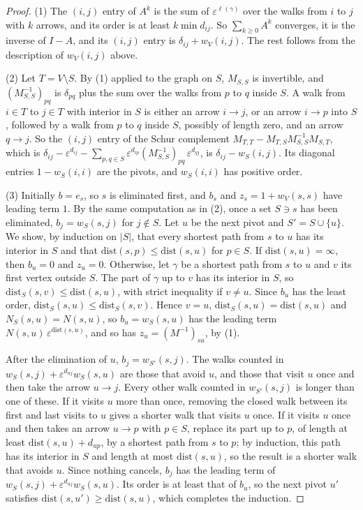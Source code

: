 \documentclass[12pt, a4paper]{report}
\theoremstyle{plain}
\theoremstyle{definition}
\theoremstyle{remark}
\theoremstyle{plain}
\begin{document}
\begin{proof}
(1) The $(i,j)$ entry of $A^k$ is the sum of $\varepsilon^{\ell(\gamma)}$ over the walks from $i$ to $j$ with $k$ arrows, and its order is at least $k\min d_{ij}$. So $\sum_{k\geq0}A^k$ converges, it is the inverse of $I-A$, and its $(i,j)$ entry is $\delta_{ij}+w_V(i,j)$. The rest follows from the description of $w_V(i,j)$ above.

(2) Let $T=V\setminus S$. By (1) applied to the graph on $S$, $M_{S,S}$ is invertible, and $(M_{S,S}^{-1})_{pq}$ is $\delta_{pq}$ plus the sum over the walks from $p$ to $q$ inside $S$. A walk from $i\in T$ to $j\in T$ with interior in $S$ is either an arrow $i\to j$, or an arrow $i\to p$ into $S$, followed by a walk from $p$ to $q$ inside $S$, possibly of length zero, and an arrow $q\to j$. So the $(i,j)$ entry of the Schur complement $M_{T,T}-M_{T,S}M_{S,S}^{-1}M_{S,T}$, which is $\delta_{ij}-\varepsilon^{d_{ij}}-\sum_{p,q\in S}\varepsilon^{d_{ip}}(M_{S,S}^{-1})_{pq}\,\varepsilon^{d_{qj}}$, is $\delta_{ij}-w_S(i,j)$. Its diagonal entries $1-w_S(i,i)$ are the pivots, and $w_S(i,i)$ has positive order.

(3) Initially $b=e_s$, so $s$ is eliminated first, and $b_s$ and $z_s=1+w_V(s,s)$ have leading term $1$. By the same computation as in (2), once a set $S\ni s$ has been eliminated, $b_j=w_S(s,j)$ for $j\notin S$. Let $u$ be the next pivot and $S'=S\cup\{u\}$. We show, by induction on $|S|$, that every shortest path from $s$ to $u$ has its interior in $S$ and that $\mathrm{dist}(s,p)\leq\mathrm{dist}(s,u)$ for $p\in S$. If $\mathrm{dist}(s,u)=\infty$, then $b_u=0$ and $z_u=0$. Otherwise, let $\gamma$ be a shortest path from $s$ to $u$ and $v$ its first vertex outside $S$. The part of $\gamma$ up to $v$ has its interior in $S$, so $\mathrm{dist}_S(s,v)\leq\mathrm{dist}(s,u)$, with strict inequality if $v\neq u$. Since $b_u$ has the least order, $\mathrm{dist}_S(s,u)\leq\mathrm{dist}_S(s,v)$. Hence $v=u$, $\mathrm{dist}_S(s,u)=\mathrm{dist}(s,u)$ and $N_S(s,u)=N(s,u)$, so $b_u=w_S(s,u)$ has the leading term $N(s,u)\,\varepsilon^{\mathrm{dist}(s,u)}$, and so has $z_u=(M^{-1})_{su}$, by (1).

After the elimination of $u$, $b_j=w_{S'}(s,j)$. The walks counted in $w_S(s,j)+\varepsilon^{d_{uj}}w_S(s,u)$ are those that avoid $u$, and those that visit $u$ once and then take the arrow $u\to j$. Every other walk counted in $w_{S'}(s,j)$ is longer than one of these. If it visits $u$ more than once, removing the closed walk between its first and last visits to $u$ gives a shorter walk that visits $u$ once. If it visits $u$ once and then takes an arrow $u\to p$ with $p\in S$, replace its part up to $p$, of length at least $\mathrm{dist}(s,u)+d_{up}$, by a shortest path from $s$ to $p$; by induction, this path has its interior in $S$ and length at most $\mathrm{dist}(s,u)$, so the result is a shorter walk that avoids $u$. Since nothing cancels, $b_j$ has the leading term of $w_S(s,j)+\varepsilon^{d_{uj}}w_S(s,u)$. Its order is at least that of $b_u$, so the next pivot $u'$ satisfies $\mathrm{dist}(s,u')\geq\mathrm{dist}(s,u)$, which completes the induction.
\end{proof}
\end{document}
